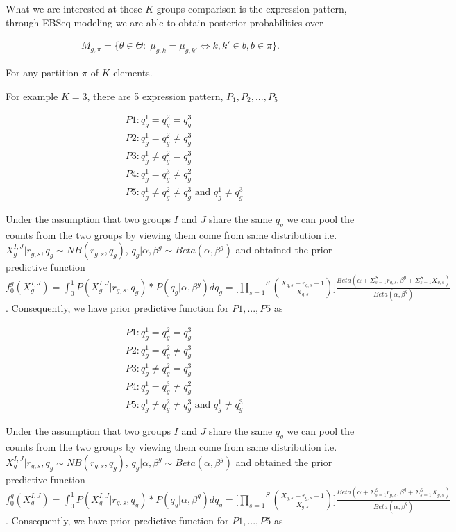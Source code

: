 \documentclass[aoas,preprint]{imsart}
\begin{document}
What we are interested at those $K$ groups comparison is the expression pattern, through EBSeq modeling we are able to obtain posterior probabilities over

\begin{eqnarray*}
M_{g,\pi} = \{ \theta \in \Theta: \; \mu_{g,k} = \mu_{g,k'} \iff k,k' \in b, b \in \pi \}.
\end{eqnarray*}

For any partition $\pi$ of $K$ elements.

For example $K = 3$, there are 5 expression pattern, $P_1, P_2, ..., P_5$

\begin{align*}
&P1: q_g^1 = q_g^2 = q_g^3\\
&P2: q_g^1 = q_g^2 \neq q_g^3\\
&P3: q_g^1 \neq q_g^2 = q_g^3\\
&P4: q_g^1 = q_g^3 \neq q_g^2\\
&P5: q_g^1 \neq q_g^2 \neq q_g^3 \text{ and } q_g^1 \neq q_g^3
\end{align*}

Under the assumption that two groups $I$ and $J$ share the same $q_g$ we can pool the counts from the two groups by viewing them come from same distribution i.e. $X_g^{I, J} | r_{g,s}, q_g \sim NB(r_{g,s}, q_g)$, $q_g | \alpha, \beta^{g} \sim Beta(\alpha, \beta^{g})$ and obtained the prior predictive function $f_0^{g}(X_g^{I,J}) = \int_0 ^1 P(X_g^{I,J} | r_{g,s}, q_g) * P(q_g | \alpha, \beta^{g}) dq_g = \Big[ \overset{S}{\underset{s = 1}{\prod}} {X_{g,s} + r_{g,s} - 1 \choose X_{g,s}} \Big] \frac{Beta(\alpha + \Sigma_{s = 1}^S r_{g,s}, \beta^{g} + \Sigma_{s = 1}^S X_{g,s})}{Beta(\alpha, \beta^{g})}$.  Consequently, we have prior predictive function for $P1, ..., P5$ as

\begin{align*}
&P1: q_g^1 = q_g^2 = q_g^3\\
&P2: q_g^1 = q_g^2 \neq q_g^3\\
&P3: q_g^1 \neq q_g^2 = q_g^3\\
&P4: q_g^1 = q_g^3 \neq q_g^2\\
&P5: q_g^1 \neq q_g^2 \neq q_g^3 \text{ and } q_g^1 \neq q_g^3
\end{align*}

Under the assumption that two groups $I$ and $J$ share the same $q_g$ we can pool the counts from the two groups by viewing them come from same distribution i.e. $X_g^{I, J} | r_{g,s}, q_g \sim NB(r_{g,s}, q_g)$, $q_g | \alpha, \beta^{g} \sim Beta(\alpha, \beta^{g})$ and obtained the prior predictive function $f_0^{g}(X_g^{I,J}) = \int_0 ^1 P(X_g^{I,J} | r_{g,s}, q_g) * P(q_g | \alpha, \beta^{g}) dq_g = \Big[ \overset{S}{\underset{s = 1}{\prod}} {X_{g,s} + r_{g,s} - 1 \choose X_{g,s}} \Big] \frac{Beta(\alpha + \Sigma_{s = 1}^S r_{g,s}, \beta^{g} + \Sigma_{s = 1}^S X_{g,s})}{Beta(\alpha, \beta^{g})}$.  Consequently, we have prior predictive function for $P1, ..., P5$ as
\end{document}
